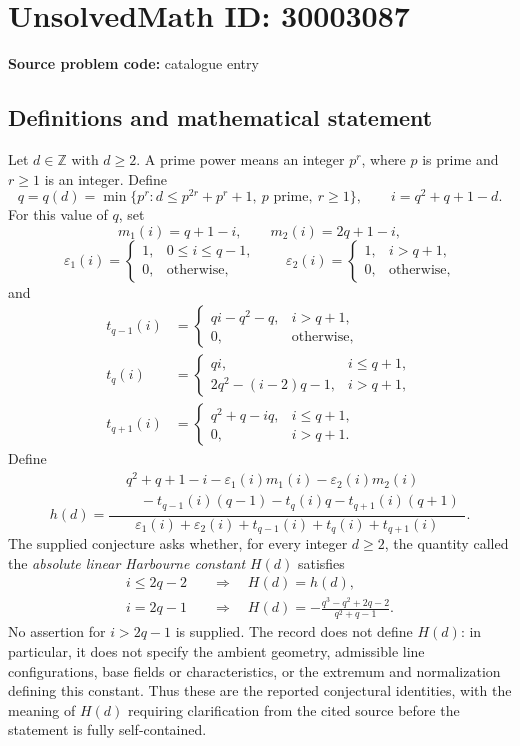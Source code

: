 \documentclass[11pt]{article}
\newcommand{\Z}{\mathbb{Z}}
\begin{document}
\section*{UnsolvedMath ID: 30003087}
\textbf{Source problem code:} catalogue entry
\subsection{Definitions and mathematical statement}
Let \(d\in\Z\) with \(d\geq2\). A prime power means an integer \(p^r\), where \(p\) is prime and \(r\geq1\) is an integer. Define
\[
q=q(d)=\min\{p^r:d\leq p^{2r}+p^r+1,\ p\text{ prime},\ r\geq1\},\qquad i=q^2+q+1-d.
\]
For this value of \(q\), set
\[
m_1(i)=q+1-i,\qquad m_2(i)=2q+1-i,
\]
\[
\varepsilon_1(i)=\begin{cases}1,&0\leq i\leq q-1,\\0,&\text{otherwise},\end{cases}
\qquad
\varepsilon_2(i)=\begin{cases}1,&i>q+1,\\0,&\text{otherwise},\end{cases}
\]
and
\[
\begin{aligned}
t_{q-1}(i)&=\begin{cases}qi-q^2-q,&i>q+1,\\0,&\text{otherwise},\end{cases}\\
t_q(i)&=\begin{cases}qi,&i\leq q+1,\\2q^2-(i-2)q-1,&i>q+1,\end{cases}\\
t_{q+1}(i)&=\begin{cases}q^2+q-iq,&i\leq q+1,\\0,&i>q+1.\end{cases}
\end{aligned}
\]
Define
\[
h(d)=\frac{\begin{aligned}&q^2+q+1-i-\varepsilon_1(i)m_1(i)-\varepsilon_2(i)m_2(i)\\&\quad-t_{q-1}(i)(q-1)-t_q(i)q-t_{q+1}(i)(q+1)\end{aligned}}{\varepsilon_1(i)+\varepsilon_2(i)+t_{q-1}(i)+t_q(i)+t_{q+1}(i)}.
\]
The supplied conjecture asks whether, for every integer \(d\geq2\), the quantity called the \emph{absolute linear Harbourne constant} \(H(d)\) satisfies
\[
\begin{aligned}
i\leq2q-2&\quad\Longrightarrow\quad H(d)=h(d),\\
i=2q-1&\quad\Longrightarrow\quad H(d)=-\frac{q^3-q^2+2q-2}{q^2+q-1}.
\end{aligned}
\]
No assertion for \(i>2q-1\) is supplied. The record does not define \(H(d)\): in particular, it does not specify the ambient geometry, admissible line configurations, base fields or characteristics, or the extremum and normalization defining this constant. Thus these are the reported conjectural identities, with the meaning of \(H(d)\) requiring clarification from the cited source before the statement is fully self-contained.
\end{document}
